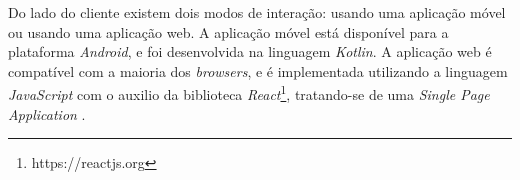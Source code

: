 Do lado do cliente existem dois modos de interação: usando uma aplicação móvel ou usando uma aplicação web. A aplicação móvel está disponível para a plataforma \textit{Android}, e foi desenvolvida na linguagem \textit{Kotlin}. A aplicação web é compatível com a maioria dos \textit{browsers}, e é implementada utilizando a linguagem \textit{JavaScript} com o auxilio da biblioteca \textit{React}\footnote{https://reactjs.org}, tratando-se de uma \textit{Single Page Application} \cite{Singlepageapplication:online}.


